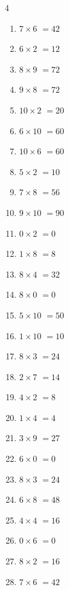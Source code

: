 \begin{multicols}{4}
\begin{enumerate}
  \item $7\times 6$
        $=42$

  \item $6\times 2$
        $=12$

  \item $8\times 9$
        $=72$

  \item $9\times 8$
        $=72$

  \item $10\times 2$
        $=20$

  \item $6\times 10$
        $=60$

  \item $10\times 6$
        $=60$

  \item $5\times 2$
        $=10$

  \item $7\times 8$
        $=56$

  \item $9\times 10$
        $=90$

  \item $0\times 2$
        $=0$

  \item $1\times 8$
        $=8$

  \item $8\times 4$
        $=32$

  \item $8\times 0$
        $=0$

  \item $5\times 10$
        $=50$

  \item $1\times 10$
        $=10$

  \item $8\times 3$
        $=24$

  \item $2\times 7$
        $=14$

  \item $4\times 2$
        $=8$

  \item $1\times 4$
        $=4$

  \item $3\times 9$
        $=27$

  \item $6\times 0$
        $=0$

  \item $8\times 3$
        $=24$

  \item $6\times 8$
        $=48$

  \item $4\times 4$
        $=16$

  \item $0\times 6$
        $=0$

  \item $8\times 2$
        $=16$

  \item $7\times 6$
        $=42$

\end{enumerate}
\end{multicols}
